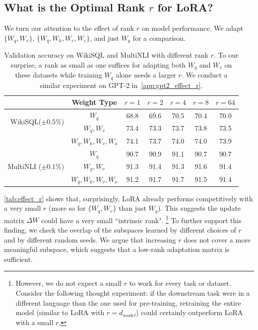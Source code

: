 \subsection{What is the Optimal Rank $r$ for LoRA?}
\label{sec:effect_of_r}

We turn our attention to the effect of rank $r$ on model performance.
We adapt $\{W_q, W_v\}$, $\{W_q, W_k, W_v, W_c\}$, and just $W_q$ for a comparison.



\begin{table}[h]
  \centering
  \begin{tabular}{r|c|ccccc}
  \hline
  \toprule
                                        & Weight Type           & $r=1$  & $r=2$  & $r=4$  & $r=8$  & $r=64$  \\
  \midrule
  \multirow{2}{*}{WikiSQL($\pm0.5$\%)}  & $W_{q}$               & 68.8   & 69.6   & 70.5   & 70.4   & 70.0    \\
                                        & $W_q, W_v$            & 73.4   & 73.3   & 73.7   & 73.8   & 73.5    \\
                                        & $W_q, W_k, W_v, W_o$  & 74.1   & 73.7   & 74.0   & 74.0   & 73.9    \\
  \midrule
  \multirow{3}{*}{MultiNLI ($\pm0.1$\%)}& $W_q$                 & 90.7   & 90.9   & 91.1   & 90.7   & 90.7    \\ 
                                        & $W_q, W_v$            & 91.3   & 91.4   & 91.3   & 91.6   & 91.4    \\ 
                                        & $W_q, W_k, W_v, W_o$  & 91.2   & 91.7   & 91.7   & 91.5   & 91.4    \\
  
  \bottomrule
  \end{tabular}
  \caption{Validation accuracy on WikiSQL and MultiNLI with different rank $r$. To our surprise, a rank as small as one suffices for adapting both $W_q$ and $W_v$ on these datasets while training $W_q$ alone needs a larger $r$. We conduct a similar experiment on GPT-2 in~\autoref{app:gpt2_effect_r}.}
  \label{tab:effect_r}
\end{table}

\autoref{tab:effect_r} shows that, surprisingly, LoRA already performs competitively with a very small $r$ (more so for $\{W_q, W_v\}$ than just $W_q$).
This suggests the update matrix $\Delta W$ could have a very small ``intrinsic rank".%
\footnote{However, we do not expect a small $r$ to work for every task or dataset.
Consider the following thought experiment: if the downstream task were in a different language than the one used for pre-training, retraining the entire model (similar to LoRA with $r=d_{model}$) could certainly outperform LoRA with a small $r$.}
To further support this finding, we check the overlap of the subspaces learned by different choices of $r$ and by different random seeds. We argue that increasing $r$ does not cover a more meaningful subspace, which suggests that a low-rank adaptation matrix is sufficient.

